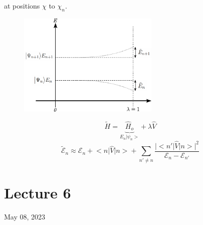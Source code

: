 \documentclass[12pt,fancychapters]{report}
\numberwithin{equation}{section}
\begin{document}
at positions $\chi$ to $\chi_n$.
\begin{figure}[H]
  \centering
	\includegraphics[width=0.6\textwidth]{../Figures/shift.pdf}
\end{figure}
\begin{equation*}
	\tilde{H} = \underbrace{\hat{H}_o}_{E_n\big|\psi_n\big>} + \lambda\hat{V}
\end{equation*}
\begin{equation*}
	\tilde{\mathcal{E}}_n \approx \mathcal{E}_n+\big<n\big|\hat{V}\big|n\big> + 
	\sum_{n'\neq n} \frac{\big|\big<n'\big|\hat{V}\big|n\big>\big|^2}{\mathcal{E}_n-\mathcal{E}_{n'}}
\end{equation*}
\newpage
\section{Lecture 6}
May 08, 2023
\end{document}
